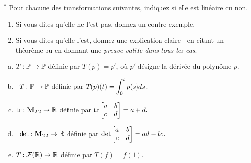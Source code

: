 \begin{prob}
\end{prob} \begin{prob} \label{prob24.4}$^\ast$ Pour chacune des transformations suivantes, indiquez si elle est linéaire ou non.   
   \smallskip    
\begin{enumerate}[$\bullet$]
\item Si vous dites qu'elle ne l'est pas, donnez un contre-exemple.   
\item Si vous dites qu'elle l'est, donnez une explication claire - en citant un théorème ou en donnant une {\it preuve valide dans tous les cas}. 
\end{enumerate}
 \medskip
\begin{enumerate}[a)]
\item $T: \mathbb{P} \to \mathbb{P}$ d\'efinie par $T(p)=p'$, où $p'$ désigne la dérivée du polynôme $p$.
\medskip
 
\item\sov~$T: \mathbb{P} \to \mathbb{P}$ d\'efinie par $T(p)(t)=\displaystyle \int_0^tp(s) ds$.
\medskip
 
\item $\operatorname{ tr}: \mathbf{M}_{2\,2} \to \mathbb{R}$ d\'efinie par $\tr\bmatrix a&b\\c&d\endbmatrix = a+d.$
\medskip
 
\item\sov~$\det: \mathbf{M}_{2\,2} \to \mathbb{R}$ d\'efinie par $\det \bmatrix a&b\\c&d\endbmatrix = ad-bc.$
\medskip
 
\item $T: \mathcal{F}(\mathbb{R}) \to \mathbb{R}$ d\'efinie par $T(f)=f(1)$.
\medskip
 
\end{enumerate}
\end{prob}